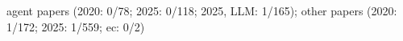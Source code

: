 agent papers (2020: 0/78; 2025: 0/118; 2025, LLM: 1/165); other papers (2020: 1/172; 2025: 1/559; ec: 0/2)